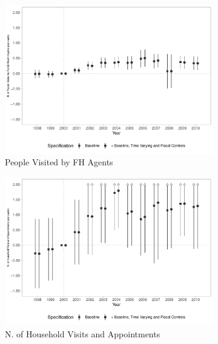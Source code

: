 \begin{figure}[h!]
\begin{center}
\begin{subfigure}{0.32\textwidth}
    \end{subfigure}
    \begin{subfigure}{0.32\textwidth}
        \centering
        \caption{\scriptsize People Visited by FH Agents}\label{fig:9c}
        \includegraphics[width=\textwidth]{plots/siab_accomp_especif_psf_pcapita_dist_ec29_baseline_dist_ec29_baseline_9.pdf}
    \end{subfigure}
        \begin{subfigure}{0.32\textwidth}
        \caption{\scriptsize N. of Household Visits and Appointments}\label{fig:9d}
        \centering
        \includegraphics[width=\textwidth]{plots/siab_visit_cons_pcapita_dist_ec29_baseline_dist_ec29_baseline_9.pdf}
    \end{subfigure}
    \begin{subfigure}{0.32\textwidth}

\end{subfigure}
\end{center}
\end{figure}
